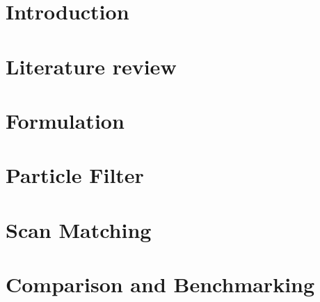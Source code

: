 \documentclass[harvard]{lincolncsuthesis}
\begin{document}
\maketitle

%




%

\thesisTables

\thesisBodyStart

\chapter{Introduction}


\chapter{Literature review}


\chapter{Formulation}


\chapter{Particle Filter}


\chapter{Scan Matching}


\chapter{Comparison and Benchmarking}

\end{document}
